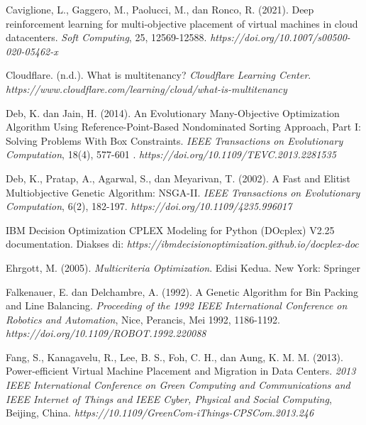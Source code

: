\begin{thebibliography}{99}
	
	Caviglione, L., Gaggero, M., Paolucci, M., dan Ronco, R. (2021). Deep reinforcement learning for multi-objective placement of virtual machines in cloud datacenters. \textit{Soft Computing}, 25, 12569-12588. \textit{https://doi.org/10.1007/s00500-020-05462-x} 
	
	

	Cloudflare. (n.d.). What is multitenancy? \textit{Cloudflare Learning Center}. \textit{https://www.cloudflare.com/learning/cloud/what-is-multitenancy}
	


	Deb, K. dan Jain, H. (2014). An Evolutionary Many-Objective Optimization Algorithm Using Reference-Point-Based Nondominated Sorting Approach, Part I: Solving Problems With Box Constraints. \textit{IEEE Transactions on Evolutionary Computation}, 18(4), 577-601 . \textit{https://doi.org/10.1109/TEVC.2013.2281535}
	
	

	Deb, K., Pratap, A., Agarwal, S., dan Meyarivan, T. (2002). A Fast and Elitist Multiobjective Genetic Algorithm: NSGA-II. \textit{IEEE Transactions on Evolutionary Computation}, 6(2), 182-197. \textit{https://doi.org/10.1109/4235.996017}
	
	

	IBM Decision Optimization CPLEX Modeling for Python (DOcplex) V2.25 documentation. Diakses di: \textit{https://ibmdecisionoptimization.github.io/docplex-doc}
	
	

	Ehrgott, M. (2005). \textit{Multicriteria Optimization}. Edisi Kedua. New York: Springer 
	
	

	Falkenauer, E. dan Delchambre, A. (1992). A Genetic Algorithm for Bin Packing and Line Balancing. \textit{Proceeding of the 1992 IEEE International Conference on Robotics and Automation}, Nice, Perancis, Mei 1992, 1186-1192. \textit{https://doi.org/10.1109/ROBOT.1992.220088}
	
	

	Fang, S., Kanagavelu, R., Lee, B. S., Foh, C. H., dan Aung, K. M. M. (2013). Power-efficient Virtual Machine Placement and Migration in Data Centers. \textit{2013 IEEE International Conference on Green Computing and Communications and IEEE Internet of Things and IEEE Cyber, Physical and Social Computing}, Beijing, China. \textit{https://10.1109/GreenCom-iThings-CPSCom.2013.246}
	

\end{thebibliography}
